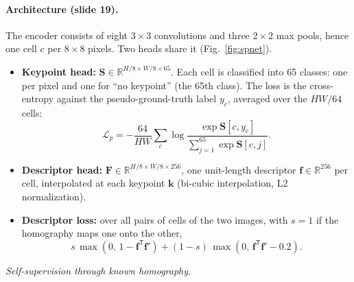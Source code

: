 \documentclass[11pt,a4paper]{article}
\newcommand{\R}{\mathbb{R}}
\newcommand{\tr}{^{\mathsf T}}
\begin{document}
\paragraph{Architecture (slide 19).}
The encoder consists of eight $3\times3$ convolutions and three $2\times2$ max pools, hence one cell $c$ per $8\times8$ pixels. Two heads share it
(Fig.~\ref{fig:spnet}).
\begin{itemize}
\item \textbf{Keypoint head:} $\bm S\in\R^{H/8\times W/8\times 65}$. Each cell is classified into 65 classes: one per pixel and one for ``no keypoint''
 (the 65th class). The loss is the cross-entropy against the pseudo-ground-truth label $y_c$, averaged over the $HW/64$ cells:
 \[
 \mathcal L_p=-\frac{64}{HW}\sum_c\log\frac{\exp\bm S[c,y_c]}{\sum_{j=1}^{65}\exp\bm S[c,j]} .
 \]
\item \textbf{Descriptor head:} $\bm F\in\R^{H/8\times W/8\times256}$, one unit-length descriptor $\bm f\in\R^{256}$ per cell, interpolated at each
 keypoint $\bm k$ (bi-cubic interpolation, L2 normalization).
\item \textbf{Descriptor loss:} over all pairs of cells of the two images, with $s=1$ if the homography maps one onto the other,
 \[
 s\,\max(0,\,1-\bm f\tr\bm f')+(1-s)\,\max(0,\,\bm f\tr\bm f'-0.2).
 \]
\end{itemize}
\emph{Self-supervision through known homography.}
\end{document}
